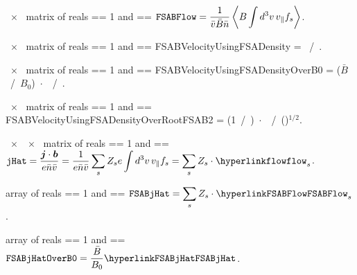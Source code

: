 {~$\times$~ matrix of reals}
{ == 1 and  == \true}
{$\displaystyle \text{\ttfamily FSABFlow} =  \frac{1}{\bar{v} \bar{B} \bar{n}} \left\langle B \int d^3v \, v_{\|} f_s \right\rangle$.}

\myhrule

{~$\times$~ matrix of reals}
{ == 1 and  == \true}
{{\ttfamily FSABVelocityUsingFSADensity} =  ~/~.}

\myhrule

{~$\times$~ matrix of reals}
{ == 1 and  == \true}
{{\ttfamily FSABVelocityUsingFSADensityOverB0} =  ($\bar{B}$~/~$B_0$)~$\cdot$~~/~.}

\myhrule

{~$\times$~ matrix of reals}
{ == 1 and  == \true}
{{\ttfamily FSABVelocityUsingFSADensityOverRootFSAB2} =  (1~/~)~$\cdot$~~/~()${}^{1/2}$.}

\myhrule

{~$\times$~~$\times$~ matrix of reals}
{ == 1 and  == \true}
{$\displaystyle \text{\ttfamily jHat} = \frac{\bm{j} \cdot \bm{b}}{e \bar{n} \bar{v}} = \frac{1}{e \bar{n} \bar{v}} \sum_s Z_s e \int d^3v \, v_{\|} f_s = \sum_s Z_s \cdot \text{\parlink{flow}}_s$.}

\myhrule

{ array of reals}
{ == 1 and  == \true}
{$\displaystyle \text{\ttfamily FSABjHat} =  \sum_s Z_s \cdot \text{\parlink{FSABFlow}}_s$.}

\myhrule

{ array of reals}
{ == 1 and  == \true}
{$\displaystyle \text{\ttfamily FSABjHatOverB0} =  \frac{\bar{B}}{B_0} \text{\parlink{FSABjHat}}$.}

\myhrule

